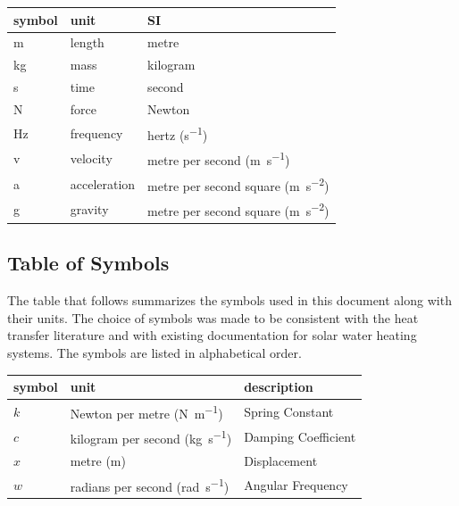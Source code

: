 \documentclass[12pt]{article}
\begin{document}
\renewcommand{\arraystretch}{1.2}
  \noindent \begin{longtable*}{l l l}
    \toprule		
    \textbf{symbol} & \textbf{unit} & \textbf{SI}\\
    \midrule 
    \si{\metre} & length & metre\\
    \si{\kilogram} & mass	& kilogram\\
    \si{\second} & time & second\\
    \si{\newton} & force & Newton\\
    \si{\hertz} & frequency & hertz (\si{\second^{-1}})\\
    v & velocity & metre per second (\si{\meter\per\second})\\
    a & acceleration & metre per second square (\si{\meter\per\square\second})\\
    g & gravity & metre per second square (\si{\meter\per\square\second})\\
    \bottomrule
  \end{longtable*}

\subsection{Table of Symbols}

The table that follows summarizes the symbols used in this document along with
their units.  The choice of symbols was made to be consistent with the heat
transfer literature and with existing documentation for solar water heating
systems.  The symbols are listed in alphabetical order.

\renewcommand{\arraystretch}{1.2}
\noindent \begin{longtable*}{l l l} \toprule
\textbf{symbol} & \textbf{unit} & \textbf{description}\\
\midrule 
$k$ & Newton per metre (\si{\newton\per\metre}) & Spring Constant\\
$c$ & kilogram per second (\si{\kilogram\per\second}) & Damping Coefficient\\
$x$ & metre (\si{\metre}) & Displacement\\
$w$ & radians per second (\si{\radian\per\second}) & Angular Frequency\\
\bottomrule
\end{longtable*}
\end{document}
